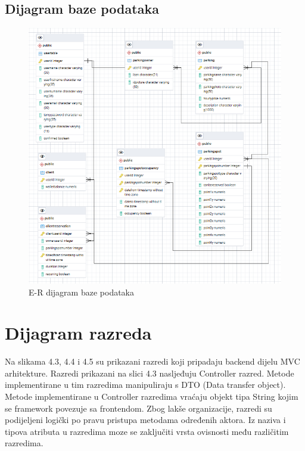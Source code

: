 \subsection{Dijagram baze podataka}


\begin{figure}[H]
	
	\includegraphics[width=\textwidth]{slike/db.png} %
	\centering
	\caption{E-R dijagram baze podataka}
	\label{fig:dijagramBP}
\end{figure}

\eject



\section{Dijagram razreda}

Na slikama 4.3, 4.4 i 4.5 su prikazani razredi koji pripadaju backend dijelu MVC
arhitekture. Razredi prikazani na slici 4.3 nasljeđuju Controller razred. Metode
implementirane u tim razredima manipuliraju s DTO (Data transfer object).
Metode implementirane u Controller razredima vraćaju objekt tipa String kojim se framework povezuje sa frontendom. Zbog lakše organizacije, razredi su podijeljeni logički po pravu pristupa metodama određenih aktora. Iz naziva i tipova atributa u razredima moze se zaključiti vrsta ovisnosti među različitim razredima.

